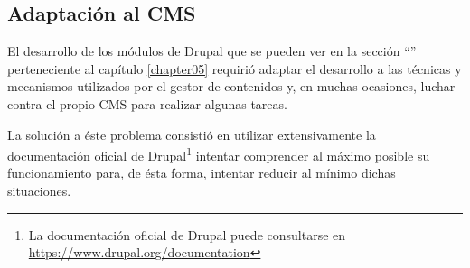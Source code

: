 	\subsection{Adaptación al CMS}
	\label{implementacion:adaptacion_cms}
	
		El desarrollo de los módulos de Drupal que se pueden ver en la sección ``'' perteneciente al capítulo \ref{chapter05} requirió adaptar el desarrollo a las técnicas y mecanismos utilizados por el gestor de contenidos y, en muchas ocasiones, luchar contra el propio CMS para realizar algunas tareas.
		
		La solución a éste problema consistió en utilizar extensivamente la documentación oficial de Drupal\footnote{La documentación oficial de Drupal puede consultarse en \url{https://www.drupal.org/documentation}} intentar comprender al máximo posible su funcionamiento para, de ésta forma, intentar reducir al mínimo dichas situaciones.

